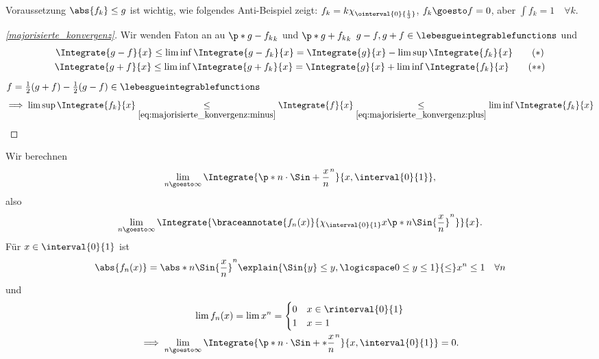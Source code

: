 \begin{bemerkung*}
  Voraussetzung \( \abs{f_k}\leq g \) ist wichtig, wie folgendes Anti-Beispiel zeigt: \( f_k=k \chi_{\ointerval{0}{\frac{1}{3}}} \), \( f_k\goesto f=0 \), aber \( \int f_k=1\quad \forall k \).
\end{bemerkung*}
\begin{proof}[\ref{majorisierte_konvergenz}]
  Wir wenden Faton an au \( \p*{g-f_k}_k \) und \( \p*{g+f_k}_k \) \timplies \( g-f,g+f\in \lebesgueintegrablefunctions \) und 
  \begin{gather*}
    \Integrate{g-f}{x}\leq \liminf \Integrate{g-f_k}{x}=\Integrate{g}{x}-\limsup \Integrate{f_k}{x}\tag{\( * \)} \label{eq:majorisierte_konvergenz:minus}\\
    \Integrate{g+f}{x}\leq \liminf \Integrate{g+f_k}{x}=\Integrate{g}{x}+\liminf \Integrate{f_k}{x}\tag{\( ** \)} \label{eq:majorisierte_konvergenz:pus}
  \end{gather*}
  \( f=\frac{1}{2}(g+f)-\frac{1}{2}(g-f)\in \lebesgueintegrablefunctions \)
  \begin{equation*}
    \implies \limsup \Integrate{f_k}{x}\underset{\eqref{eq:majorisierte_konvergenz:minus}}{\leq}\Integrate{f}{x}\underset{\eqref{eq:majorisierte_konvergenz:plus}}{\leq}\liminf \Integrate{f_k}{x}
  \end{equation*}
\end{proof}
\begin{beispiel*}
  Wir berechnen
  \begin{equation*}
    \lim_{n \goesto \infty}\Integrate{\p*{n\cdot\Sin+{\frac{x}{n}}}^n}{x,\interval{0}{1}},
  \end{equation*}
  also
  \begin{equation*}
    \lim_{n \goesto \infty}\Integrate{\braceannotate{f_n(x)}{\chi_{\interval{0}{1}}{x}\p*{n\Sin{\frac{x}{n}}}^n}}{x}.
  \end{equation*}
  Für \( x\in \interval{0}{1} \) ist
  \begin{equation*}
    \abs{f_n(x)}=\abs*{n{\Sin{\frac{x}{n}}}}^n\explain{\Sin{y}\leq y,\logicspace 0\leq y\leq 1}{\leq}x^n\leq 1\quad \forall n
  \end{equation*}
  und
  \begin{gather*}
    \lim f_n(x)=\lim  x^n=\begin{cases}
      0 & x\in \rinterval{0}{1}\\
      1 & x=1
    \end{cases}\\
    \implies \lim_{n \goesto \infty}\Integrate{\p*{n\cdot\Sin+*{\frac{x}{n}}}^n}{x,\interval{0}{1}}=0.
  \end{gather*}
\end{beispiel*}


